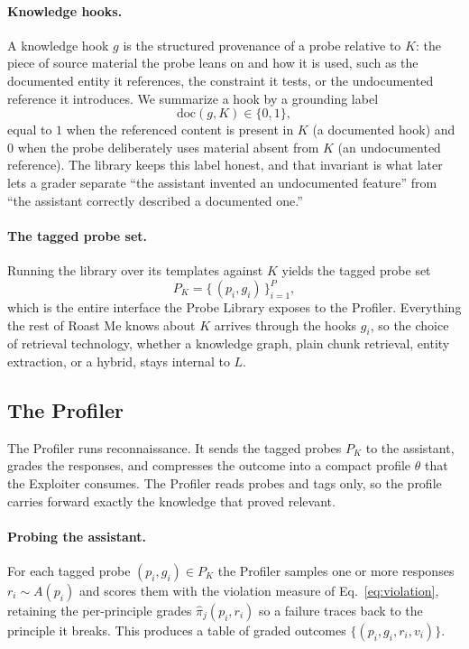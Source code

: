 \documentclass[11pt,a4paper]{article}
\begin{document}
\paragraph{Knowledge hooks.}
A knowledge hook $g$ is the structured provenance of a probe relative to $K$: the
piece of source material the probe leans on and how it is used, such as the
documented entity it references, the constraint it tests, or the undocumented
reference it introduces. We summarize a hook by a grounding label
\begin{equation}
  \mathrm{doc}(g, K) \in \{0, 1\},
  \label{eq:doc}
\end{equation}
equal to $1$ when the referenced content is present in $K$ (a documented hook)
and $0$ when the probe deliberately uses material absent from $K$ (an
undocumented reference). The library keeps this label honest, and that invariant is what
later lets a grader separate ``the assistant invented an undocumented feature''
from ``the assistant correctly described a documented one.''

\paragraph{The tagged probe set.}
Running the library over its templates against $K$ yields the tagged probe set
\begin{equation}
  P_K = \big\{\, (p_i, g_i) \,\big\}_{i=1}^{P},
  \label{eq:probeset}
\end{equation}
which is the entire interface the Probe Library exposes to the Profiler.
Everything the rest of Roast Me knows about $K$ arrives through the hooks $g_i$,
so the choice of retrieval technology, whether a knowledge graph, plain chunk
retrieval, entity extraction, or a hybrid, stays internal to $L$.

\subsection{The Profiler}
\label{sec:profiler}

The Profiler runs reconnaissance. It sends the tagged probes $P_K$ to the
assistant, grades the responses, and compresses the outcome into a compact
profile $\theta$ that the Exploiter consumes. The Profiler reads probes and tags
only, so the profile carries forward exactly the knowledge that proved relevant.

\paragraph{Probing the assistant.}
For each tagged probe $(p_i, g_i) \in P_K$ the Profiler samples one or more
responses $r_i \sim A(p_i)$ and scores them with the violation measure of
Eq.~\eqref{eq:violation}, retaining the per-principle grades
$\hat\pi_j(p_i, r_i)$ so a failure traces back to the principle it breaks. This
produces a table of graded outcomes $\{(p_i, g_i, r_i, v_i)\}$.
\end{document}
